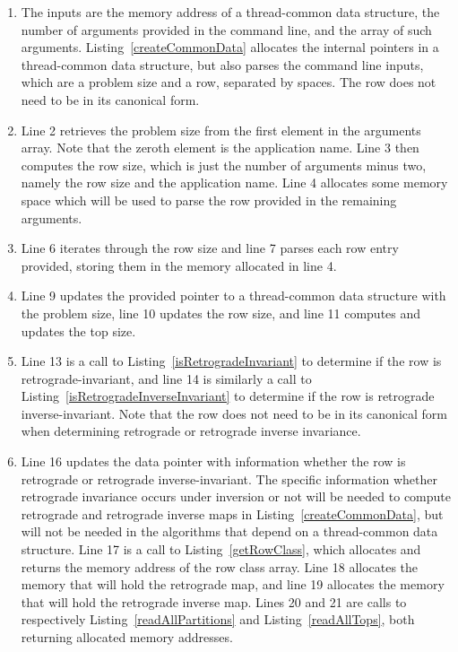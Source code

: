 \begin{enumerate}
\item The inputs are the memory address of a thread-common data structure, the number of arguments provided in the command line, and the array of such arguments. Listing~\ref{createCommonData} allocates the internal pointers in a thread-common data structure, but also parses the command line inputs, which are a problem size and a row, separated by spaces. The row does not need to be in its canonical form.
\item Line 2 retrieves the problem size from the first element in the arguments array. Note that the zeroth element is the application name. Line 3 then computes the row size, which is just the number of arguments minus two, namely the row size and the application name. Line 4 allocates some memory space which will be used to parse the row provided in the remaining arguments.
\addtocounter{enumi}{3}
\item Line 6 iterates through the row size and line 7 parses each row entry provided, storing them in the memory allocated in line 4.
\addtocounter{enumi}{2}
\item Line 9 updates the provided pointer to a thread-common data structure with the problem size, line 10 updates the row size, and line 11 computes and updates the top size.
\addtocounter{enumi}{3}
\item Line 13 is a call to Listing~\ref{isRetrogradeInvariant} to determine if the row is retrograde-invariant, and line 14 is similarly a call to Listing~\ref{isRetrogradeInverseInvariant} to determine if the row is retrograde inverse-invariant. Note that the row does not need to be in its canonical form when determining retrograde or retrograde inverse invariance.
\addtocounter{enumi}{2}
\item Line 16 updates the data pointer with information whether the row is retrograde or retrograde inverse-invariant. The specific information whether retrograde invariance occurs under inversion or not will be needed to compute retrograde and retrograde inverse maps in Listing~\ref{createCommonData}, but will not be needed in the algorithms that depend on a thread-common data structure. Line 17 is a call to Listing~\ref{getRowClass}, which allocates and returns the memory address of the row class array. Line 18 allocates the memory that will hold the retrograde map, and line 19 allocates the memory that will hold the retrograde inverse map. Lines 20 and 21 are calls to respectively Listing~\ref{readAllPartitions} and Listing~\ref{readAllTops}, both returning allocated memory addresses.

\end{enumerate}
